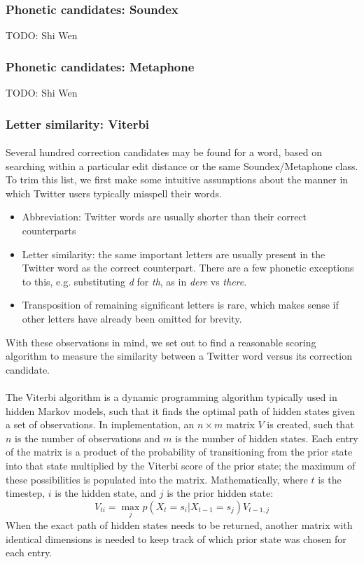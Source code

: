 \documentclass[twocolumn,10pt]{article}
\begin{document}
\subsubsection*{Phonetic candidates: Soundex}
TODO: Shi Wen
\subsubsection*{Phonetic candidates: Metaphone}
TODO: Shi Wen
\subsubsection*{Letter similarity: Viterbi}
\paragraph{} Several hundred correction candidates may be found for a word, based on searching within a particular edit distance or the same Soundex/Metaphone class. To trim this list, we first make some intuitive assumptions about the manner in which Twitter users typically misspell their words.
\begin{itemize}
\item Abbreviation: Twitter words are usually shorter than their correct counterparts
\item Letter similarity: the same important letters are usually present in the Twitter word as the correct counterpart. There are a few phonetic exceptions to this, e.g. substituting \textit{d} for \textit{th}, as in \textit{dere} vs \textit{there}.
\item Transposition of remaining significant letters is rare, which makes sense if other letters have already been omitted for brevity.
\end{itemize}
With these observations in mind, we set out to find a reasonable scoring algorithm to measure the similarity between a Twitter word versus its correction candidate.

\paragraph{} The Viterbi algorithm is a dynamic programming algorithm typically used in hidden Markov models, such that it finds the optimal path of hidden states given a set of observations. In implementation, an $n\times m$ matrix $V$ is created, such that $n$ is the number of observations and $m$ is the number of hidden states. Each entry of the matrix is a product of the probability of transitioning from the prior state into that state multiplied by the Viterbi score of the prior state; the maximum of these possibilities is populated into the matrix. Mathematically, where $t$ is the timestep, $i$ is the hidden state, and $j$ is the prior hidden state:
$$V_{ti} = \max\limits_j p(X_t = s_i | X_{t-1} = s_j) V_{t-1,j}$$
When the exact path of hidden states needs to be returned, another matrix with identical dimensions is needed to keep track of which prior state was chosen for each entry.
\end{document}
